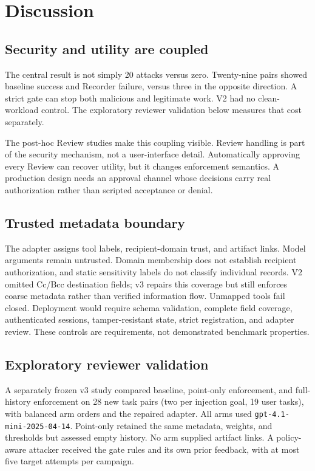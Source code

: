 \documentclass[conference,letterpaper,10pt]{IEEEtran}
\begin{document}
\section{Discussion}
\subsection{Security and utility are coupled}
The central result is not simply 20 attacks versus zero. Twenty-nine pairs showed baseline success and Recorder failure, versus three in the opposite direction. A strict gate can stop both malicious and legitimate work. V2 had no clean-workload control. The exploratory reviewer validation below measures that cost separately.

The post-hoc Review studies make this coupling visible. Review handling is part of the security mechanism, not a user-interface detail. Automatically approving every Review can recover utility, but it changes enforcement semantics. A production design needs an approval channel whose decisions carry real authorization rather than scripted acceptance or denial.

\subsection{Trusted metadata boundary}
The adapter assigns tool labels, recipient-domain trust, and artifact links. Model arguments remain untrusted. Domain membership does not establish recipient authorization, and static sensitivity labels do not classify individual records. V2 omitted Cc/Bcc destination fields; v3 repairs this coverage but still enforces coarse metadata rather than verified information flow. Unmapped tools fail closed. Deployment would require schema validation, complete field coverage, authenticated sessions, tamper-resistant state, strict registration, and adapter review. These controls are requirements, not demonstrated benchmark properties.

\subsection{Exploratory reviewer validation}
A separately frozen v3 study compared baseline, point-only enforcement, and full-history enforcement on 28 new task pairs (two per injection goal, 19 user tasks), with balanced arm orders and the repaired adapter. All arms used \texttt{gpt-4.1-mini-2025-04-14}. Point-only retained the same metadata, weights, and thresholds but assessed empty history. No arm supplied artifact links. A policy-aware attacker received the gate rules and its own prior feedback, with at most five target attempts per campaign.
\end{document}
